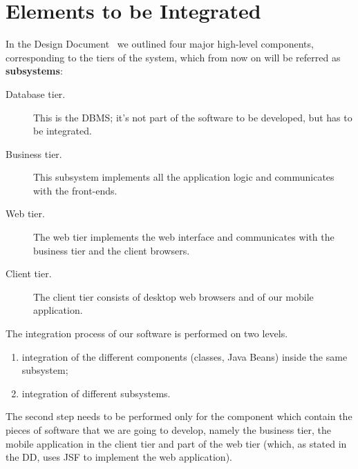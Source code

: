 \section{Elements to be Integrated}
\label{sec:elements}

In the Design Document~\cite[p.~6]{mytaxi-dd} we outlined four major high-level components, corresponding to the tiers of the system, which from now on will be referred as \textbf{subsystems}:
\begin{description}
    \item[Database tier.] This is the DBMS; it's not part of the software to be developed, but has to be integrated.
    \item[Business tier.] This subsystem implements all the application logic and communicates with the front-ends.
    \item[Web tier.] The web tier implements the web interface and communicates with the business tier and the client browsers.
    \item[Client tier.] The client tier consists of desktop web browsers and of our mobile application.
\end{description}

The integration process of our software is performed on two levels.
\begin{enumerate}
    \item integration of the different components (classes, Java Beans) inside the same subsystem;
    \item integration of different subsystems.
\end{enumerate}

The second step needs to be performed only for the component which contain the pieces of software that we are going to develop, namely the business tier, the mobile application in the client tier and part of the web tier (which, as stated in the DD, uses JSF to implement the web application).


